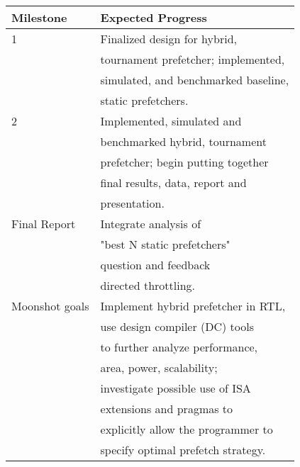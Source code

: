 \documentclass[pageno]{jpaper}
\begin{document}
\begin{table}[h!]
  \centering
  \begin{tabular}{|l|l|}
    \hline
    \textbf{Milestone} & \textbf{Expected Progress}\\
    \hline
    \hline
    1 & Finalized design for hybrid, \\
        &tournament prefetcher; implemented, \\
        &simulated, and benchmarked baseline, \\
        &static prefetchers.\\
    \hline
    2 & Implemented, simulated and \\
        &benchmarked hybrid, tournament \\
        &prefetcher; begin putting together\\
        &final results, data, report and \\
        &presentation.\\
    \hline
    Final Report & Integrate analysis of \\
                    &"best N static prefetchers"\\
                    &question and feedback \\
                    &directed throttling.\\
    \hline
    Moonshot goals & Implement hybrid prefetcher in RTL,\\
                    &use design compiler (DC) tools \\
                    &to further analyze performance, \\
                    &area, power, scalability;\\
                    &investigate possible use of ISA \\
                    &extensions and pragmas to \\
                    &explicitly allow the programmer to\\
                    &specify optimal prefetch strategy.\\
    \hline
  \end{tabular}
  \label{table:formatting}
\end{table}





\end{document}
